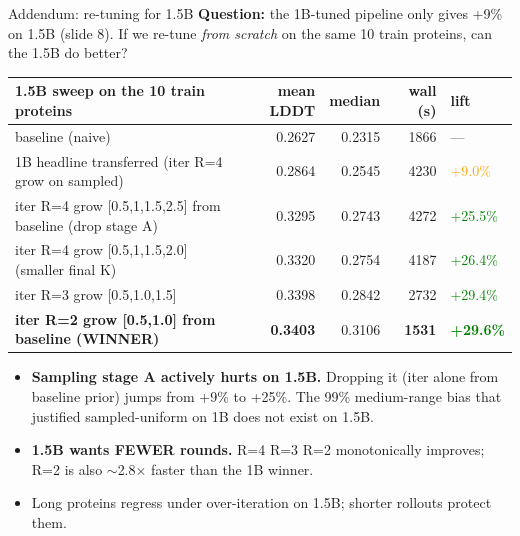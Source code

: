 \documentclass[aspectratio=169,11pt]{beamer}
\begin{document}
\begin{frame}{Addendum: re-tuning for 1.5B}
  \textbf{Question:} the 1B-tuned pipeline only gives +9\% on 1.5B
  (slide 8). If we re-tune \emph{from scratch} on the same 10 train
  proteins, can the 1.5B do better?
  \vspace{0.4em}
  \begin{center}\small
    \begin{tabular}{lrrr@{\hspace{1.4em}}l}
      \toprule
      1.5B sweep on the 10 train proteins & mean LDDT & median & wall (s) & lift \\
      \midrule
      baseline (naive)                                   & 0.2627 & 0.2315 & 1866 & --- \\
      1B headline transferred (iter R=4 grow on sampled) & 0.2864 & 0.2545 & 4230 & \textcolor{orange}{+9.0\%} \\
      iter R=4 grow [0.5,1,1.5,2.5] from baseline (drop stage A) & 0.3295 & 0.2743 & 4272 & \textcolor{green}{+25.5\%} \\
      iter R=4 grow [0.5,1,1.5,2.0] (smaller final K)    & 0.3320 & 0.2754 & 4187 & \textcolor{green}{+26.4\%} \\
      iter R=3 grow [0.5,1.0,1.5]                        & 0.3398 & 0.2842 & 2732 & \textcolor{green}{+29.4\%} \\
      \textbf{iter R=2 grow [0.5,1.0] from baseline (WINNER)} & \textbf{0.3403} & 0.3106 & \textbf{1531} & \textcolor{green}{\textbf{+29.6\%}} \\
      \bottomrule
    \end{tabular}
  \end{center}
  \vspace{0.4em}
  \begin{itemize}
    \setlength\itemsep{0.15em}
    \item \textbf{Sampling stage A actively hurts on 1.5B.} Dropping
          it (iter alone from baseline prior) jumps from +9\% to
          +25\%. The 99\% medium-range bias that justified
          sampled-uniform on 1B does not exist on 1.5B.
    \item \textbf{1.5B wants FEWER rounds.} R=4 \textrightarrow{} R=3
          \textrightarrow{} R=2 monotonically improves; R=2 is also
          $\sim$2.8$\times$ faster than the 1B winner.
    \item Long proteins regress under over-iteration on 1.5B;
          shorter rollouts protect them.
  \end{itemize}
\end{frame}
\end{document}
